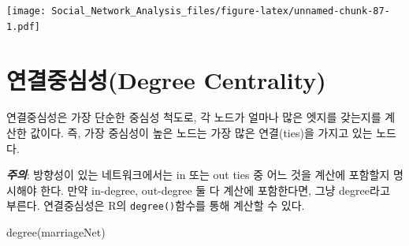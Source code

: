 \documentclass[
]{book}
\newenvironment{Shaded}{\begin{snugshade}}{\end{snugshade}}
\newcommand{\FunctionTok}[1]{\textcolor[rgb]{0.00,0.00,0.00}{#1}}
\newcommand{\NormalTok}[1]{#1}
\begin{document}
\texttt{[image: Social\_Network\_Analysis\_files/figure-latex/unnamed-chunk-87-1.pdf]}

\hypertarget{uxc5f0uxacb0uxc911uxc2ecuxc131degree-centrality}{%
\section{연결중심성(Degree Centrality)}\label{uxc5f0uxacb0uxc911uxc2ecuxc131degree-centrality}}

연결중심성은 가장 단순한 중심성 척도로, 각 노드가 얼마나 많은 엣지를 갖는지를 계산한 값이다. 즉, 가장 중심성이 높은 노드는 가장 많은 연결(ties)을 가지고 있는 노드다.

\textbf{\emph{주의}}: 방향성이 있는 네트워크에서는 in 또는 out ties 중 어느 것을 계산에 포함할지 명시해야 한다. 만약 in-degree, out-degree 둘 다 계산에 포함한다면, 그냥 degree라고 부른다.
연결중심성은 R의 \texttt{degree()}함수를 통해 계산할 수 있다.

\begin{Shaded}
\begin{Highlighting}[]
\FunctionTok{degree}\NormalTok{(marriageNet) }
\end{Highlighting}
\end{Shaded}
\end{document}
